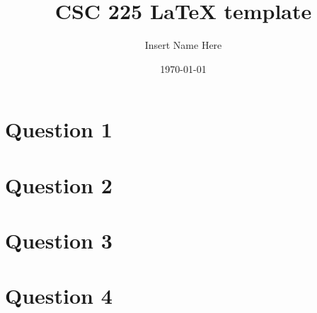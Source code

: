 \documentclass[letterpaper, 12pt]{artikel3}
\title{CSC 225 LaTeX template}
\date{ \today }
\author{Insert Name Here}
\begin{document}
\maketitle


\section*{Question 1}



\section*{Question 2}


\section*{Question 3}

\section*{Question 4}
\end{document}

